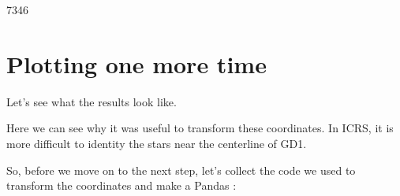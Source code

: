 \documentclass[letterpaper,10pt,english]{sphinxmanual}
\begin{document}
\begin{sphinxVerbatim}[commandchars=\\\{\}]
  
\end{sphinxVerbatim}

\begin{sphinxVerbatim}[commandchars=\\\{\}]
7346
\end{sphinxVerbatim}


\section{Plotting one more time}
\label{\detokenize{04_select:plotting-one-more-time}}
Let’s see what the results look like.

\begin{sphinxVerbatim}[commandchars=\\\{\}]
  \PYG{p}{[}\PYG{p}{]}
  \PYG{p}{[}\PYG{p}{]}
    

\end{sphinxVerbatim}

\noindent{}

Here we can see why it was useful to transform these coordinates.  In ICRS, it is more difficult to identity the stars near the centerline of GD\sphinxhyphen{}1.

So, before we move on to the next step, let’s collect the code we used to transform the coordinates and make a Pandas :
\end{document}
